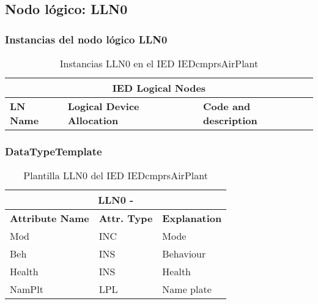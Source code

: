
\subsection{Nodo l\'ogico: 			 LLN0}

    \subsubsection{Instancias del nodo l\'ogico LLN0}
    \begin{table}[H]
    \begin{center}
    \begin{tabular}{|l|l|p{6.8cm}|}
            \hline
            \multicolumn{3}{|c|}{\cellcolor[gray]{0.8} \textbf{IED Logical Nodes} } \\
            \hline
            \textbf{LN Name} & \textbf{Logical Device Allocation} & \textbf{Code and description} \\
            \hline
    \end{tabular}
    \caption{Instancias LLN0 en el IED IEDcmprsAirPlant}
    \label{table:lnInstLLN0_1}
    \end{center}
    \end{table}
    
    
    
    \subsubsection{DataTypeTemplate}
    \begin{table}[H]
    \begin{center}
    \begin{tabular}{|l|l|p{8.5cm}|}
            \hline
            \multicolumn{3}{|c|}{\cellcolor[gray]{0.8} \textbf{ LLN0}  -  } \\
            \hline
            \textbf{Attribute Name} & \textbf{Attr. Type} & \textbf{Explanation} \\
            \hline 
            Mod & INC & Mode \\
            \hline
            Beh & INS & Behaviour \\
            \hline
            Health & INS & Health \\
            \hline
            NamPlt & LPL & Name plate \\
            \hline
    \end{tabular}
    \caption{Plantilla LLN0 del IED IEDcmprsAirPlant}
    \label{table:lnTypeLLN0_1}
    \end{center}
    \end{table}
    
    
    